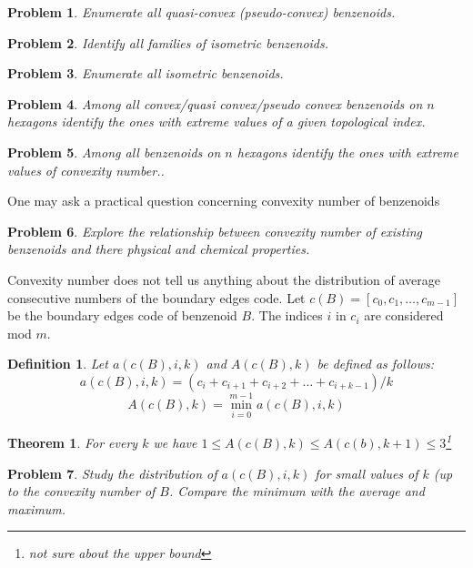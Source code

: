 \documentclass[a4paper,10pt]{article}
\newcounter{theorem}
\newtheorem{definition}{Definition}[section]
\newtheorem{theorem}{Theorem}[section]
\newtheorem{problem}{Problem}[section]
\begin{document}
{\begin{problem}
Enumerate all quasi-convex (pseudo-convex) benzenoids.
\end{problem}


\begin{problem}
Identify all families of isometric benzenoids.
\end{problem}

\begin{problem}
Enumerate all isometric benzenoids.
\end{problem}

\begin{problem}
Among all convex/quasi convex/pseudo convex benzenoids on $n$ hexagons identify the ones with extreme values of a given topological index.
\end{problem}

\begin{problem}
Among all benzenoids on $n$ hexagons identify the ones with extreme values of convexity number..
\end{problem}

One may ask a practical question concerning convexity number of benzenoids

\begin{problem}
Explore the relationship between convexity number of existing benzenoids and there physical and chemical properties.
\end{problem}

Convexity number does not tell us anything about the distribution of average consecutive numbers of the boundary edges code.
Let $c(B) = [c_0,c_1,\ldots, c_{m-1}]$ be the boundary edges code of benzenoid $B$. The indices $i$ in $c_i$ are considered mod $m$. 

\begin{definition}
Let $a(c(B),i,k)$ and $A(c(B),k)$ be defined as follows:
$$a(c(B),i,k) = (c_i + c_{i+1}+c_{i+2}+\ldots+c_{i+k-1})/k$$ 
$$A(c(B),k) = \min_{i =0}^{m-1}a(c(B),i,k)$$
\end{definition}


\begin{theorem}
For every $k$ we have $1\leq A(c(B),k) \leq A(c(b),k+1) \leq 3$\footnote{not sure about the upper bound}
\end{theorem}


\begin{problem}
Study the distribution of $a(c(B),i,k)$ for small values of $k$ (up to the convexity number of $B$. Compare the minimum with the average and maximum.
\end{problem}



}
\end{document}
